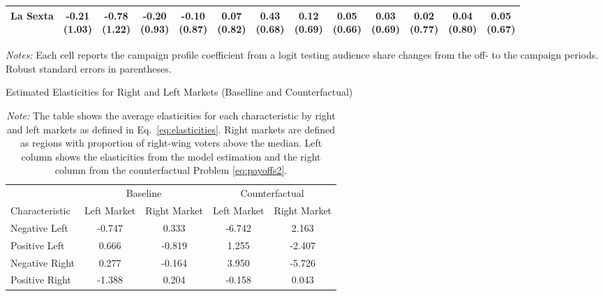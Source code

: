 \documentclass[12pt]{article}
\begin{document}
\begin{table}[!htbp]
\begin{threeparttable}
\begin{tabular}{lcccccccccc|cc}
			La Sexta & \shortstack{-0.21\\(1.03)} & \shortstack{-0.78\\(1.22)} & \shortstack{-0.20\\(0.93)} & \shortstack{-0.10\\(0.87)} & \shortstack{0.07\\(0.82)} & \shortstack{0.43\\(0.68)} & \shortstack{0.12\\(0.69)} & \shortstack{0.05\\(0.66)} & \shortstack{0.03\\(0.69)} & \shortstack{0.02\\(0.77)} & \shortstack{0.04\\(0.80)} & \shortstack{0.05\\(0.67)} \\
			\bottomrule
		\end{tabular}
		\begin{tablenotes}\footnotesize
			\item \textit{Notes:} Each cell reports the campaign profile coefficient from a logit testing audience share changes from the off- to the campaign periods. Robust standard errors in parentheses. 
		\end{tablenotes}
	\end{threeparttable}
\end{table}






\begin{table}[!htb]
	\centering
	\caption{Estimated Elasticities for Right and Left Markets (Baselline and Counterfactual)}
	\begin{tabular}{l|cc|cc}
		\toprule
		& \multicolumn{2}{c|}{Baseline} & \multicolumn{2}{c}{Counterfactual} \\
		Characteristic & Left Market & Right Market & Left Market & Right Market \\
		\midrule
		Negative Left & -0.747 & 0.333 & -6.742 & 2.163 \\
		Positive Left & 0.666 & -0.819 & 1.255 & -2.407 \\
		Negative Right & 0.277 & -0.164 & 3.950 & -5.726 \\
		Positive Right & -1.388 & 0.204 & -0.158 & 0.043 \\
		\bottomrule
	\end{tabular}
	\caption*{\textit{Note:} \small The table shows the average elasticities for each characteristic by right and left markets as defined in Eq.~\eqref{eq:elasticities}. Right markets are defined as regions with proportion of right-wing voters above the median. Left column shows the elasticities from the model estimation and the right column from the counterfactual Problem \eqref{eq:payoffs2}.}
	\label{tab:elasticities_count}
\end{table}
\end{document}
